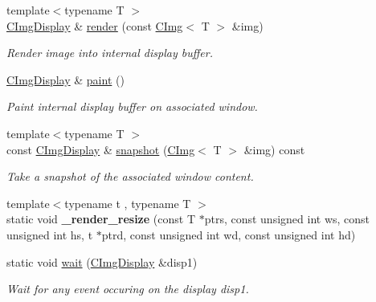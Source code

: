 \begin{DoxyCompactItemize}
{\footnotesize template$<$typename T $>$ }\\\hyperlink{structcimg__library__suffixed_1_1CImgDisplay}{C\+Img\+Display} \& \hyperlink{structcimg__library__suffixed_1_1CImgDisplay_a267d574c78d29cd9f475a30b206882c6}{render} (const \hyperlink{structcimg__library__suffixed_1_1CImg}{C\+Img}$<$ T $>$ \&img)
\begin{DoxyCompactList}\small\item\em Render image into internal display buffer. \end{DoxyCompactList}\item 
\hyperlink{structcimg__library__suffixed_1_1CImgDisplay}{C\+Img\+Display} \& \hyperlink{structcimg__library__suffixed_1_1CImgDisplay_aff557cf3b60169ddfd4336b37c653fe0}{paint} ()
\begin{DoxyCompactList}\small\item\em Paint internal display buffer on associated window. \end{DoxyCompactList}\item 
{\footnotesize template$<$typename T $>$ }\\const \hyperlink{structcimg__library__suffixed_1_1CImgDisplay}{C\+Img\+Display} \& \hyperlink{structcimg__library__suffixed_1_1CImgDisplay_a914ee0515249db301dc66275861a6b3e}{snapshot} (\hyperlink{structcimg__library__suffixed_1_1CImg}{C\+Img}$<$ T $>$ \&img) const
\begin{DoxyCompactList}\small\item\em Take a snapshot of the associated window content. \end{DoxyCompactList}\item 
\mbox{\label{structcimg__library__suffixed_1_1CImgDisplay_aa266002819b144f972fb02d40084c2b0}} 
{\footnotesize template$<$typename t , typename T $>$ }\\static void {\bfseries \+\_\+render\+\_\+resize} (const T $\ast$ptrs, const unsigned int ws, const unsigned int hs, t $\ast$ptrd, const unsigned int wd, const unsigned int hd)
\item 
\mbox{\label{structcimg__library__suffixed_1_1CImgDisplay_a713c383eac22260b4f1726e2b4c87f87}} 
static void \hyperlink{structcimg__library__suffixed_1_1CImgDisplay_a713c383eac22260b4f1726e2b4c87f87}{wait} (\hyperlink{structcimg__library__suffixed_1_1CImgDisplay}{C\+Img\+Display} \&disp1)
\begin{DoxyCompactList}\small\item\em Wait for any event occuring on the display {\ttfamily disp1}. \end{DoxyCompactList}\item 

\end{DoxyCompactItemize}
